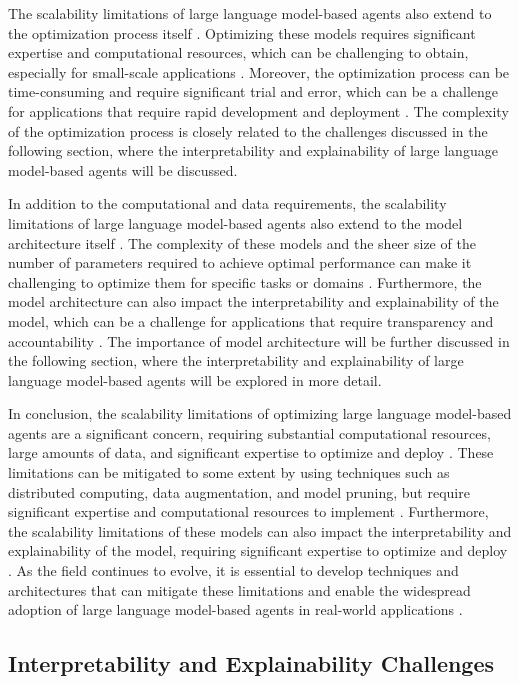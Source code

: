 \documentclass[11pt]{article}
\begin{document}
The scalability limitations of large language model-based agents also extend to the optimization process itself \cite{ref80}. Optimizing these models requires significant expertise and computational resources, which can be challenging to obtain, especially for small-scale applications \cite{ref258}. Moreover, the optimization process can be time-consuming and require significant trial and error, which can be a challenge for applications that require rapid development and deployment \cite{ref259}. The complexity of the optimization process is closely related to the challenges discussed in the following section, where the interpretability and explainability of large language model-based agents will be discussed.

In addition to the computational and data requirements, the scalability limitations of large language model-based agents also extend to the model architecture itself \cite{ref260}. The complexity of these models and the sheer size of the number of parameters required to achieve optimal performance can make it challenging to optimize them for specific tasks or domains \cite{ref261}. Furthermore, the model architecture can also impact the interpretability and explainability of the model, which can be a challenge for applications that require transparency and accountability \cite{ref262}. The importance of model architecture will be further discussed in the following section, where the interpretability and explainability of large language model-based agents will be explored in more detail.

In conclusion, the scalability limitations of optimizing large language model-based agents are a significant concern, requiring substantial computational resources, large amounts of data, and significant expertise to optimize and deploy \cite{ref11}. These limitations can be mitigated to some extent by using techniques such as distributed computing, data augmentation, and model pruning, but require significant expertise and computational resources to implement \cite{ref263}. Furthermore, the scalability limitations of these models can also impact the interpretability and explainability of the model, requiring significant expertise to optimize and deploy \cite{ref228}. As the field continues to evolve, it is essential to develop techniques and architectures that can mitigate these limitations and enable the widespread adoption of large language model-based agents in real-world applications \cite{ref264}.

\subsection{Interpretability and Explainability Challenges}
\end{document}
